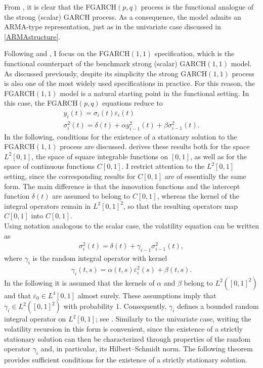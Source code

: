 \documentclass[12pt,a4paper]{article}
\theoremstyle{definition}
\begin{document}
From , it is clear that the FGARCH$(p,q)$ process is the functional analogue of the strong (scalar) GARCH process. As a consequence, the model admits an ARMA-type representation, just as in the univariate case discussed in \cref{ARMAstructure}.

Following \citet{Aue2017} and \citet{RICE20201023}, I focus on the FGARCH$(1,1)$ specification, which is the functional counterpart of the benchmark strong (scalar) GARCH$(1,1)$ model. As discussed previously, despite its simplicity the strong GARCH$(1,1)$ process is also one of the most widely used specifications in practice. For this reason, the FGARCH$(1,1)$ model is a natural starting point in the functional setting. In this case, the FGARCH$(p,q)$ equations reduce to
\begin{gather}
    \label{FunctionalGARCH11}
    y_i(t) = \sigma_i(t)\varepsilon_i(t)\\
    \label{FunctionalGARCH11volatility}
    \sigma_i^2(t) = \delta(t)+\alpha y_{i-1}^2(t)+\beta\sigma_{i-1}^2(t).
\end{gather}
In the following, conditions for the existence of a stationary solution to the FGARCH$(1,1)$ process are discussed. \citet{Aue2017} derives these results both for the space $L^2[0,1]$, the space of square integrable functions on $[0,1]$, as well as for the space of continuous functions $C[0,1]$. I restrict attention to the $L^2[0,1]$ setting, since the corresponding results for $C[0,1]$ are of essentially the same form. The main difference is that the innovation functions and the intercept function $\delta(t)$ are assumed to belong to $C[0,1]$, whereas the kernel of the integral operators remain in $L^2[0,1]^2$, so that the resulting operators map $C[0,1]$ into $C[0,1]$.\\
Using notation analogous to the scalar case, the volatility equation can be written as
\begin{gather}
\label{FGARCH11volatilityalternative}
    \sigma_i^2(t) = \delta(t) + \gamma_{i-1}\sigma_{i-1}^2(t),
\end{gather}
where $\gamma_i$ is the random integral operator with kernel
\begin{gather}
    \gamma_i(t,s)=\alpha(t,s)\varepsilon_i^2(s)+\beta(t,s).
\end{gather}
In the following it is assumed that the kernels of $\alpha$ and $\beta$ belong to $L^2([0,1]^2)$ and that $\varepsilon_0\in L^4[0,1]$ almost surely. These assumptions imply that $\gamma_i\in L^2([0,1]^2)$ with probability $1$. Consequently, $\gamma_i$ defines a bounded random integral operator on $L^2[0,1]$; see \citet{riesz1990functional}. Similarly to the univariate case, writing the volatility recursion in this form is convenient, since the existence of a strictly stationary solution can then be characterized through properties of the random operator $\gamma_i$ and, in particular, its Hilbert--Schmidt norm. The following theorem provides sufficient conditions for the existence of a strictly stationary solution.
\end{document}
